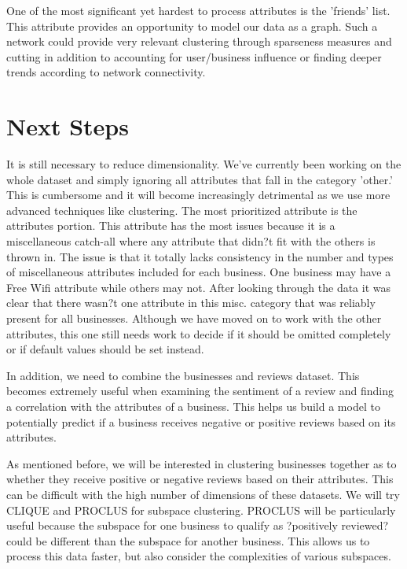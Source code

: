 \quad One of the most significant yet hardest to process attributes is the 'friends' list. This attribute provides an opportunity to model our data as a graph. Such a network could provide very relevant clustering through sparseness measures and cutting in addition to accounting for user/business influence or finding deeper trends according to network connectivity.  
\quad
\section{Next Steps}

\quad It is still necessary to reduce dimensionality. We've currently been working on the whole dataset and simply ignoring all attributes that fall in the category 'other.' This is cumbersome and it will become increasingly detrimental as we use more advanced techniques like clustering. The most prioritized attribute is the attributes portion. This attribute has the most issues because it is a miscellaneous catch-all where any attribute that didn?t fit with the others is thrown in. The issue is that it totally lacks consistency in the number and types of miscellaneous attributes included for each business. One business may have a Free Wifi attribute while others may not. After looking through the data it was clear that there wasn?t one attribute in this misc. category that was reliably present for all businesses. Although we have moved on to work with the other attributes, this one still needs work to decide if it should be omitted completely or if default values should be set instead.

\quad In addition, we need to combine the businesses and reviews dataset. This becomes extremely useful when examining the sentiment of a review and finding a correlation with the attributes of a business. This helps us build a model to potentially predict if a business receives negative or positive reviews based on its attributes. 

\quad As mentioned before, we will be interested in clustering businesses together as to whether they receive positive or negative reviews based on their attributes. This can be difficult with the high number of dimensions of these datasets. We will try CLIQUE and PROCLUS for subspace clustering. PROCLUS will be particularly useful because the subspace for one business to qualify as ?positively reviewed? could be different than the subspace for another business. This allows us to process this data faster, but also consider the complexities of various subspaces. 

